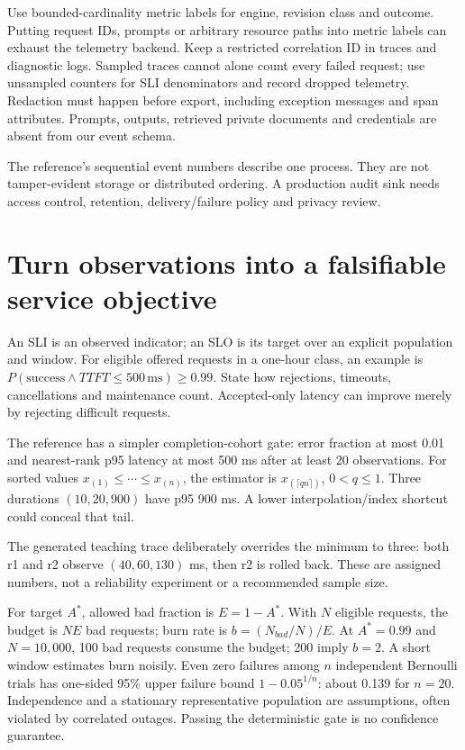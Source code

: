 Use bounded-cardinality metric labels for engine, revision class and outcome.
Putting request IDs, prompts or arbitrary resource paths into metric labels
can exhaust the telemetry backend. Keep a restricted correlation ID in traces
and diagnostic logs. Sampled traces cannot alone count every failed request;
use unsampled counters for SLI denominators and record dropped telemetry.
Redaction must happen before export, including exception messages and span
attributes. Prompts, outputs, retrieved private documents and credentials
are absent from our event schema.

The reference's sequential event numbers describe one process. They are not
tamper-evident storage or distributed ordering. A production audit sink needs
access control, retention, delivery/failure policy and privacy review.

\section{Turn observations into a falsifiable service objective}
\label{evod44:slo}
An SLI is an observed indicator; an SLO is its target over an explicit
population and window. For eligible offered requests in a one-hour class,
an example is $P(\text{success}\land TTFT\le500\,\mathrm{ms})\ge0.99$.
State how rejections, timeouts, cancellations and maintenance count.
Accepted-only latency can improve merely by rejecting difficult requests.

The reference has a simpler completion-cohort gate: error fraction at most
0.01 and nearest-rank p95 latency at most 500 ms after at least 20 observations.
For sorted values $x_{(1)}\le\cdots\le x_{(n)}$, the estimator is
$x_{(\lceil qn\rceil)}$, $0<q\le1$. Three durations $(10,20,900)$ have
p95 900 ms. A lower interpolation/index shortcut could conceal that tail.
\begin{center}\end{center}
The generated teaching trace deliberately overrides the minimum to three:
both r1 and r2 observe $(40,60,130)$ ms, then r2 is rolled back. These are
assigned numbers, not a reliability experiment or a recommended sample size.

For target $A^*$, allowed bad fraction is $E=1-A^*$. With $N$ eligible
requests, the budget is $NE$ bad requests; burn rate is
$b=(N_{bad}/N)/E$. At $A^*=0.99$ and $N=10{,}000$, 100 bad requests consume
the budget; 200 imply $b=2$. A short window estimates burn noisily. Even zero
failures among $n$ independent Bernoulli trials has one-sided 95\% upper
failure bound $1-0.05^{1/n}$: about 0.139 for $n=20$. Independence and a
stationary representative population are assumptions, often violated by
correlated outages. Passing the deterministic gate is no confidence guarantee.

